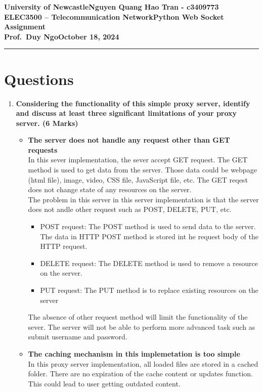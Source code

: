 \documentclass[11pt]{article}
\newcommand{\myname}{Nguyen Quang Hao Tran - c3409773}
\newcommand{\assignment}{Python Web Socket Assignment}
\newcommand{\duedate}{October 18, 2024}
\begin{document}
	
	\textbf{University of Newcastle}\hfill\textbf{\myname}\\[0.01in]
	\textbf{ELEC3500 -- Telecommunication Network}\hfill\textbf{\assignment}\\[0.01in]
	\textbf{Prof.\ Duy Ngo}\hfill\textbf{\duedate}\\
	\smallskip\hrule\bigskip
	
	\section{Questions}
	\begin{enumerate}
		\item \textbf{Considering the functionality of this simple proxy server, identify and discuss at least three significant limitations of your proxy server. (6 Marks)}
			\begin{itemize}
				\item \textbf{The server does not handle any request other than GET requests}\\
				In this sever implementation, the sever accept GET request. The GET method is used to get data from the server. Those data could be webpage (html file), image, video, CSS file, JavaScript file, etc. The GET reqest does not change state of any resources on the server.\\
				The problem in this server in this server implementation is that the server does not andle other request such as POST, DELETE, PUT, etc.
					\begin{itemize}
						\item POST request: The POST method is used to send data to the server. The data in HTTP POST method is stored int he request body of the HTTP request.
						\item DELETE request: The DELETE method is used to remove a resource on the server.
						\item PUT request: The PUT method is to replace existing resources on the server
					\end{itemize}
				The absence of other request method will limit the functionality of the sever. The server will not be able to perform more advanced task such as submit username and password.\\
				
				\item \textbf{The caching mechanism in this implemetation is too simple}\\
				In this proxy server implementation, all loaded files are stored in a cached folder. There are no expiration of the cache content or updates function. This could lead to user getting outdated content.\\
				

\end{itemize}
\end{enumerate}
\end{document}
